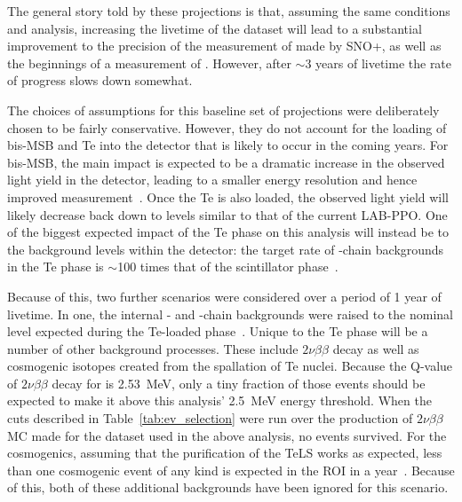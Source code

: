 The general story told by these projections is that, assuming the same conditions and analysis, increasing the livetime of the dataset will lead to a substantial improvement to the precision of the measurement of \tonetwo{} made by SNO+, as well as the beginnings of a measurement of \dmsq{}. However, after $\sim$3 years of livetime the rate of progress slows down somewhat.

The choices of assumptions for this baseline set of projections were deliberately chosen to be fairly conservative. However, they do not account for the loading of bis-MSB and Te into the detector that is likely to occur in the coming years. For bis-MSB, the main impact is expected to be a dramatic increase in the observed light yield in the detector, leading to a smaller energy resolution and hence improved measurement~\cite{albaneseSNOExperiment2021}. %
Once the Te is also loaded, the observed light yield will likely decrease back down to levels similar to that of the current LAB-PPO. One of the biggest expected impact of the Te phase on this analysis will instead be to the background levels within the detector: the target rate of -chain backgrounds in the Te phase is $\sim$100 times that of the scintillator phase~\cite{andringaCurrentStatusFuture2016}. %

Because of this, two further scenarios were considered over a period of 1 year of livetime. In one, the internal - and -chain backgrounds were raised to the nominal level expected during the Te-loaded phase~\cite{kroupovaImprovingSensitivityNeutrinoless2020}. %
Unique to the Te phase will be a number of other background processes. These include $2\nu\beta\beta$ decay as well as cosmogenic isotopes created from the spallation of Te nuclei. Because the Q-value of $2\nu\beta\beta$ decay for  is \SI{2.53}{\MeV}, only a tiny fraction of those events should be expected to make it above this analysis' \SI{2.5}{\MeV} energy threshold. When the cuts described in Table~\ref{tab:ev_selection} were run over the production of $2\nu\beta\beta$ MC made for the dataset used in the above analysis, no events survived. For the cosmogenics, assuming that the purification of the TeLS works as expected, less than one cosmogenic event of any kind is expected in the \onbb{} ROI in a year~\cite{kroupovaImprovingSensitivityNeutrinoless2020}. %
Because of this, both of these additional backgrounds have been ignored for this scenario.

